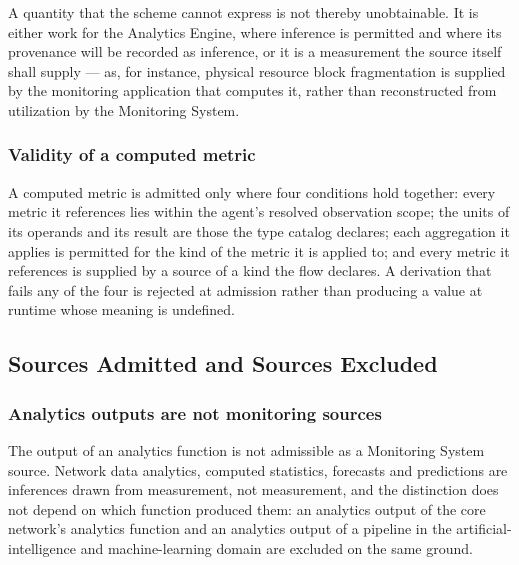 A quantity that the scheme cannot express is not thereby unobtainable.
It is either work for the Analytics Engine, where inference is permitted
and where its provenance will be recorded as inference, or it is a
measurement the source itself shall supply --- as, for instance,
physical resource block fragmentation is supplied by the monitoring
application that computes it, rather than reconstructed from utilization
by the Monitoring System.

\hypertarget{validity-of-a-computed-metric}{%
\subsubsection{Validity of a computed metric}\label{validity-of-a-computed-metric}}

A computed metric is admitted only where four conditions hold together:
every metric it references lies within the agent's resolved observation
scope; the units of its operands and its result are those the type
catalog declares; each aggregation it applies is permitted for the kind
of the metric it is applied to; and every metric it references is
supplied by a source of a kind the flow declares. A derivation that
fails any of the four is rejected at admission rather than producing a
value at runtime whose meaning is undefined.

\hypertarget{sources-admitted-and-sources-excluded}{%
\subsection{Sources Admitted and Sources Excluded}\label{sources-admitted-and-sources-excluded}}

\hypertarget{analytics-outputs-are-not-monitoring-sources}{%
\subsubsection{Analytics outputs are not monitoring sources}\label{analytics-outputs-are-not-monitoring-sources}}

The output of an analytics function is not admissible as a Monitoring
System source. Network data analytics, computed statistics, forecasts
and predictions are inferences drawn from measurement, not measurement,
and the distinction does not depend on which function produced them: an
analytics output of the core network's analytics function and an
analytics output of a pipeline in the artificial-intelligence and
machine-learning domain are excluded on the same ground.


